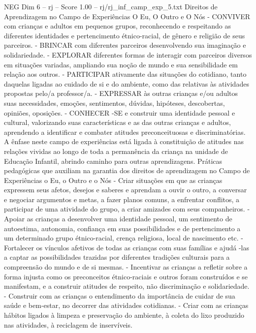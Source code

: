 \begin{textsample}{NEG Dim 6 – rj – Score 1.00 – rj/rj\_inf\_camp\_exp\_5.txt}  \label{ex:f6_neg_011}
Direitos de Aprendizagem no Campo de Experiências O Eu, O Outro e O Nós - CONVIVER com crianças e adultos em pequenos grupos, reconhecendo e respeitando as diferentes identidades e pertencimento étnico-racial, de gênero e religião de seus parceiros. - BRINCAR com diferentes parceiros desenvolvendo sua imaginação e solidariedade. - EXPLORAR diferentes formas de interagir com parceiros diversos em situações variadas, ampliando sua noção de mundo e sua sensibilidade em relação aos outros. - PARTICIPAR ativamente das situações do cotidiano, tanto daquelas ligadas ao cuidado de si e do ambiente, como das relativas às atividades propostas pelo/a professor/a. - EXPRESSAR às outras crianças e/ou adultos suas necessidades, emoções, sentimentos, dúvidas, hipóteses, descobertas, opiniões, oposições. - CONHECER -SE e construir uma identidade pessoal e cultural, valorizando suas características e as das outras crianças e adultos, aprendendo a identificar e combater atitudes preconceituosas e discriminatórias.
A ênfase neste campo de experiências está ligada à constituição de atitudes nas relações vividas ao longo de toda a permanência da criança na unidade de Educação Infantil, abrindo caminho para outras aprendizagens.
Práticas pedagógicas que auxiliam na garantia dos direitos de aprendizagem no Campo de Experiências o Eu, o Outro e o Nós - Criar situações em que as crianças expressem seus afetos, desejos e saberes e aprendam a ouvir o outro, a conversar e negociar argumentos e metas, a fazer planos comuns, a enfrentar conflitos, a participar de uma atividade do grupo, a criar amizades com seus companheiros. - Apoiar as crianças a desenvolver uma identidade pessoal, um sentimento de autoestima, autonomia, confiança em suas possibilidades e de pertencimento a um determinado grupo étnico-racial, crença religiosa, local de nascimento etc. - Fortalecer os vínculos afetivos de todas as crianças com suas famílias e ajudá -las a captar as possibilidades trazidas por diferentes tradições culturais para a compreensão do mundo e de si mesmas. - Incentivar as crianças a refletir sobre a forma injusta como os preconceitos étnico-raciais e outros foram construídos e se manifestam, e a construir atitudes de respeito, não discriminação e solidariedade. - Construir com as crianças o entendimento da importância de cuidar de sua saúde e bem-estar, no decorrer das atividades cotidianas. - Criar com as crianças hábitos ligados à limpeza e preservação do ambiente, à coleta do lixo produzido nas atividades, à reciclagem de inservíveis.

\end{textsample}
